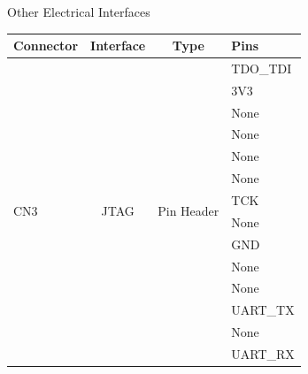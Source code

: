 \begin{frame}{Other Electrical Interfaces}

    \begin{table}[!htb]\tiny
        \centering
        \label{tab:icd}
        \begin{tabular}{lccl}
            \toprule[1.5pt]
            \textbf{Connector} & \textbf{Interface} & \textbf{Type} & \textbf{Pins} \\
            \midrule
            \multirow{14}{*}{CN3} & \multirow{14}{*}{JTAG} & \multirow{14}{*}{Pin Header} & TDO\_TDI \\
                                  &                        &                              & 3V3 \\
                                  &                        &                              & None \\
                                  &                        &                              & None \\
                                  &                        &                              & None \\
                                  &                        &                              & None \\
                                  &                        &                              & TCK \\
                                  &                        &                              & None \\
                                  &                        &                              & GND \\
                                  &                        &                              & None \\
                                  &                        &                              & None \\
                                  &                        &                              & UART\_TX \\
                                  &                        &                              & None \\
                                  &                        &                              & UART\_RX \\

            \bottomrule[1.5pt]
        \end{tabular}
    \end{table}

\end{frame}

